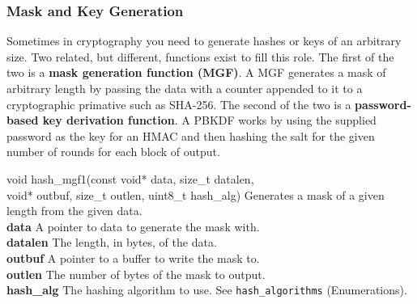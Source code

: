 \documentclass[titlepage]{article}
\begin{document}
		\subsubsection{Mask and Key Generation}
			Sometimes in cryptography you need to generate hashes or keys of an arbitrary size. Two related, but different, functions exist to fill this role. The first of the two is a \textbf{mask generation function (MGF)}. A MGF generates a mask of arbitrary length by passing the data with a counter appended to it to a cryptographic primative such as SHA-256. The second of the two is a \textbf{password-based key derivation function}. A PBKDF works by using the supplied password as the key for an HMAC and then hashing the salt for the given number of rounds for each block of output.
				\begin{functionspec}[]{void hash\_mgf1(const void* data, size\_t datalen,\\\tabto{30mm}void* outbuf, size\_t outlen, uint8\_t hash\_alg)}
				Generates a mask of a given length from the given data.\\
				\textbf{data} A pointer to data to generate the mask with.\\
				\textbf{datalen} The length, in bytes, of the data.\\
				\textbf{outbuf} A pointer to a buffer to write the mask to.\\
				\textbf{outlen} The number of bytes of the mask to output.\\
				\textbf{hash\_alg} The hashing algorithm to use. See \texttt{hash\_algorithms} (Enumerations).
			\end{functionspec}
			\vspace{1mm}
\end{document}
